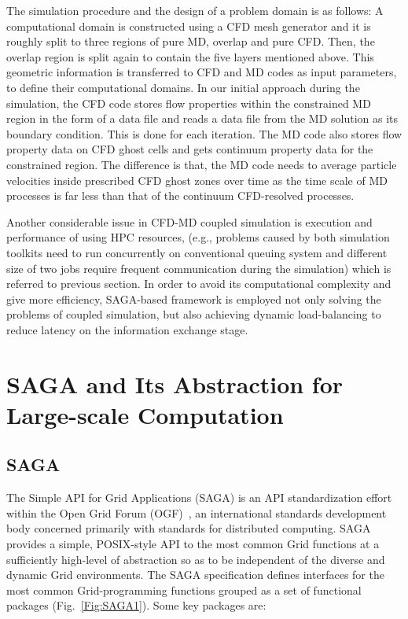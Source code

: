 \documentclass[conference,final]{IEEEtran}
\newcommand{\Nkimnote}[1]{ {\textcolor{green} { ***Nkim: #1 }}}
\newcommand{\Nkimnote}[1]{}
\begin{document}
The simulation procedure and the design of a problem domain is as follows: A 
computational domain is constructed using a CFD mesh generator and it is roughly split to 
three regions of pure MD, overlap and pure CFD. Then, the overlap region is split again 
to contain the five layers mentioned above. This geometric information is transferred to 
CFD and MD codes as input parameters, to define their computational domains. In our 
initial approach during the simulation, the CFD code stores flow properties within the 
constrained MD region in the form of a data file and reads a data file from the MD 
solution as its boundary condition. This is done for each iteration. The MD code also 
stores flow property data on CFD ghost cells and gets continuum property data for the 
constrained region. The difference is that, the MD code needs to average particle 
velocities inside prescribed CFD ghost zones over time as the time scale of MD processes 
is far less than that of the continuum CFD-resolved processes.

Another considerable issue in CFD-MD coupled simulation is execution and performance of 
using HPC resources, (e.g., problems caused by both simulation toolkits need to run 
concurrently on conventional queuing system and different size of two jobs require 
frequent communication during the simulation) which is referred to previous section. In 
order to avoid its computational complexity and give more efficiency, SAGA-based 
framework is employed not only solving the problems of coupled simulation, but also 
achieving dynamic load-balancing to reduce latency on the information exchange stage.


\section{SAGA and Its Abstraction for Large-scale Computation}

\subsection{SAGA}

The Simple API for Grid Applications (SAGA) is an API standardization effort within the 
Open Grid Forum (OGF)~\cite{ogf_web}, an international standards development body 
concerned primarily with standards for distributed computing. SAGA provides a simple, 
POSIX-style API to the most common Grid functions at a sufficiently high-level of 
abstraction so as to be %
independent of the diverse and dynamic Grid environments. The SAGA specification defines 
interfaces for the most common Grid-programming functions grouped as a set of functional 
packages (Fig.~\ref{Fig:SAGA1}). Some key packages are:
\end{document}
